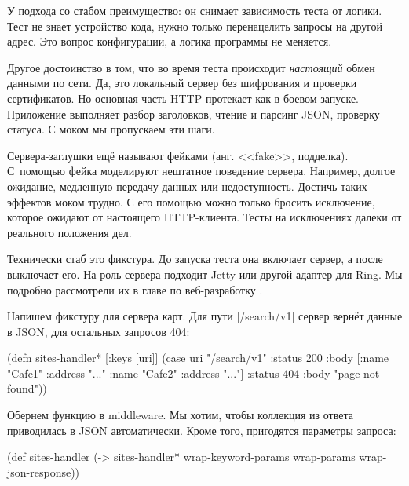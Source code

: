 У подхода со стабом преимущество: он снимает зависимость теста от логики. Тест
не знает устройство кода, нужно только перенацелить запросы на другой адрес. Это
вопрос конфигурации, а логика программы не меняется.

Другое достоинство в том, что во время теста происходит \emph{настоящий} обмен
данными по сети. Да, это локальный сервер без шифрования и проверки
сертификатов. Но основная часть HTTP протекает как в боевом запуске. Приложение
выполняет разбор заголовков, чтение и парсинг JSON, проверку статуса. С моком мы
пропускаем эти шаги.


Сервера-заглушки ещё называют фейками (анг. <<fake>>, подделка). С~помощью фейка
моделируют нештатное поведение сервера. Например, долгое ожидание, медленную
передачу данных или недоступность. Достичь таких эффектов моком трудно. С его
помощью можно только бросить исключение, которое ожидают от настоящего
HTTP-клиента. Тесты на исключениях далеки от реального положения дел.

Технически стаб это фикстура. До запуска теста она включает сервер, а после
выключает его. На роль сервера подходит Jetty или другой адаптер для Ring. Мы
подробно рассмотрели их в главе по веб-разработку .

Напишем фикстуру для сервера карт. Для пути \spverb|/search/v1| сервер вернёт
данные в JSON, для остальных запросов 404:

\label{sites-handler}

\begin{english}
  \begin{clojure}
(defn sites-handler* [{:keys [uri]}]
  (case uri
    "/search/v1"
    {:status 200
     :body [{:name "Cafe1" :address "..."}
            {:name "Cafe2" :address "..."}]}
    {:status 404
     :body "page not found"}))
  \end{clojure}
\end{english}


Обернем функцию в middleware. Мы хотим, чтобы коллекция из ответа приводилась в
JSON автоматически. Кроме того, пригодятся параметры запроса:

\begin{english}
  \begin{clojure}
(def sites-handler
  (-> sites-handler*
      wrap-keyword-params
      wrap-params
      wrap-json-response))
  \end{clojure}
\end{english}

